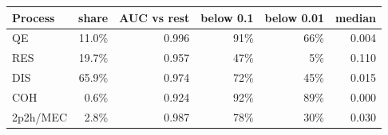 \begin{tabular}{lrrrrr}
\toprule
Process & share & AUC vs rest & below 0.1 & below 0.01 & median \\
\midrule
QE & 11.0\% & 0.996 & 91\% & 66\% & 0.004 \\
RES & 19.7\% & 0.957 & 47\% & 5\% & 0.110 \\
DIS & 65.9\% & 0.974 & 72\% & 45\% & 0.015 \\
COH & 0.6\% & 0.924 & 92\% & 89\% & 0.000 \\
2p2h/MEC & 2.8\% & 0.987 & 78\% & 30\% & 0.030 \\
\bottomrule
\end{tabular}
